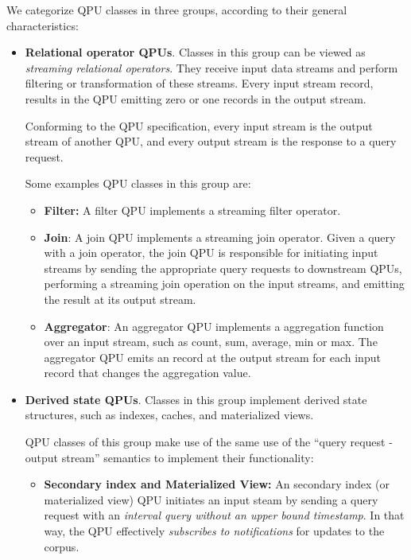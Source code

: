 We categorize QPU classes in three groups, according to their general characteristics:
\begin{itemize}
  \item \textbf{Relational operator QPUs}.
  Classes in this group can be viewed as \textit{streaming relational operators}.
  They receive input data streams and perform filtering or transformation of these streams.
  Every input stream record, results in the QPU emitting zero or one records in the output stream.

  Conforming to the QPU specification, every input stream is the output stream of another QPU,
  and every output stream is the response to a query request.

  Some examples QPU classes in this group are:
  \begin{itemize}
    \item \textbf{Filter:}
    A filter QPU implements a streaming filter operator.
    \item \textbf{Join}:
    A join QPU implements a streaming join operator.
    Given a query with a join operator,
    the join QPU is responsible for initiating input streams by sending the appropriate query requests to downstream QPUs,
    performing a streaming join operation on the input streams, and emitting the result at its output stream.
    \item \textbf{Aggregator}:
    An aggregator QPU implements a aggregation function over an input stream, such as count, sum, average, min or max.
    The aggregator QPU emits an record at the output stream for each input record that changes the aggregation value.
  \end{itemize}

  \item \textbf{Derived state QPUs}.
  Classes in this group implement derived state structures, such as indexes, caches, and materialized views.

  QPU classes of this group make use of the same use of the ``query request - output stream'' semantics to implement
  their functionality:
  \begin{itemize}
    \item \textbf{Secondary index and Materialized View:}
    An secondary index (or materialized view) QPU initiates an input steam by sending a query request with an \textit{interval query without
    an upper bound timestamp}.
    In that way, the QPU effectively \textit{subscribes to notifications} for updates to the corpus.


\end{itemize}
\end{itemize}
